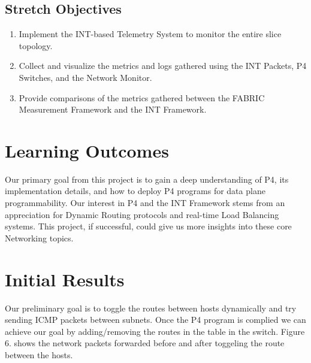 \documentclass[conference]{IEEEtran}
\begin{document}
    \subsection{Stretch Objectives}
    \begin{enumerate}
        \item Implement the INT-based Telemetry System to monitor the entire slice topology.
        \item Collect and visualize the metrics and logs gathered using the INT Packets, P4 Switches, and the Network Monitor.
        \item Provide comparisons of the metrics gathered between the FABRIC Measurement Framework and the INT Framework.
    \end{enumerate}


    \section{Learning Outcomes}
    Our primary goal from this project is to gain a deep understanding of P4, its implementation details, and how to deploy P4 programs for data plane programmability. Our interest in P4 and the INT Framework stems from an appreciation for Dynamic Routing protocols and real-time Load Balancing systems. This project, if successful, could give us more insights into these core Networking topics.


    \section{Initial Results}
    Our preliminary goal is to toggle the routes between hosts dynamically and try sending ICMP packets between subnets. Once the P4 program is complied we can achieve our goal by adding/removing the routes in the table in the switch. Figure 6. shows the network packets forwarded before and after toggeling the route between the hosts.
\end{document}
